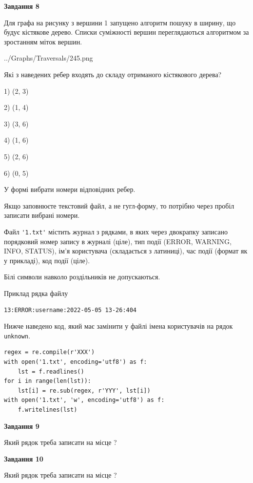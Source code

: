 \documentclass[12pt, ukrainian]{article}
\def\code#1{\Verb!#1!}
\begin{document}
{\begin {large}
{\begin {center}\textbf{Завдання 8}\end {center}}\par
Для графа на рисунку з вершини 1 запущено алгоритм пошуку в ширину, що будує кістякове дерево. Списки суміжності вершин переглядаються алгоритмом за зростанням міток вершин.\par
\begin{center}
	{../Graphs/Traversals/245.png}
\end{center}
\par Які з наведених ребер входять до складу отриманого кістякового дерева?\par
1) (2, 3)\par
2) (1, 4)\par
3) (3, 6)\par
4) (1, 6)\par
5) (2, 6)\par
6) (0, 5)\par
{\vskip 15pt} У формі вибрати номери відповідних ребер.


Якщо заповнюєте текстовий файл, а не гугл-форму, то потрібно через пробіл записа\-ти вибрані номери.\par
\newpage


Файл \code{'1.txt'} містить журнал з рядками, в яких через двокрапку записано поряд\-ко\-вий номер запису в журналі (ціле), тип події (ERROR, WARNING, INFO, STATUS), ім'я користувача (складається з латиниці), час події (фор\-мат як у прикладі), код події (ціле).

Білі символи навколо роздільників не допускаються.

Приклад рядка файлу



\begin{verbatim}
13:ERROR:username:2022-05-05 13-26:404
\end{verbatim}


Нижче наведено код, який має замінити у файлі імена користувачів на рядок \code{unknown}.



\begin{verbatim}
regex = re.compile(r'XXX')
with open('1.txt', encoding='utf8') as f:
    lst = f.readlines()
for i in range(len(lst)):
    lst[i] = re.sub(regex, r'YYY', lst[i])
with open('1.txt', 'w', encoding='utf8') as f:
    f.writelines(lst)
\end{verbatim}




{\begin {center}\textbf{Завдання 9}\end {center}}\par
Який рядок треба записати на місце  ?\par
\vspace{5mm}


{\begin {center}\textbf{Завдання 10}\end {center}}\par
Який рядок треба записати на місце  ?\par


\newpage


\end {large}}
\end{document}
